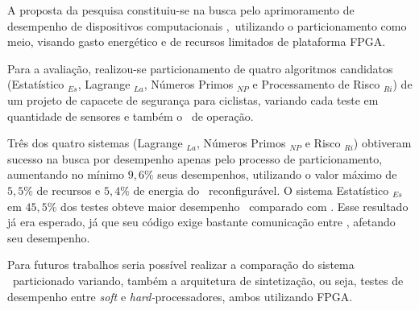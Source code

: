     A proposta da pesquisa constituiu-se na busca pelo aprimoramento de desempenho de dispositivos computacionais \wearables,\ utilizando o particionamento como meio, visando gasto energético e de recursos limitados de plataforma FPGA.
    
    Para a avaliação, realizou-se particionamento de quatro algoritmos candidatos (Estatístico \A$_{Es}$, Lagrange \A$_{La}$, Números Primos  \A$_{NP}$ e Processamento de Risco \A$_{Ri}$) de um projeto de capacete de segurança para ciclistas, variando cada teste em quantidade de sensores e também o \buffer\ de operação.
    
    Três dos quatro sistemas (Lagrange \Ss$_{La}$, Números Primos \Ss$_{NP}$ e Risco \Ss$_{Ri}$) obtiveram sucesso na busca por desempenho apenas pelo processo de particionamento, aumentando no mínimo $9,6\%$ seus desempenhos, utilizando o valor máximo de $ 5,5\% $ de recursos e $ 5,4\% $ de energia do \hardware\ reconfigurável.
    O sistema Estatístico \Ss$_{Es}$ em $45,5\%$ dos testes obteve maior desempenho \software\ comparado com \hardware.
    Esse resultado já era esperado, já que seu código exige bastante comunicação entre \hs, afetando seu desempenho.
    
    Para futuros trabalhos seria possível realizar a comparação do sistema \wearable\ particionado variando, também a arquitetura de sintetização, ou seja, testes de desempenho entre \textit{soft} e \textit{hard-}processadores, ambos utilizando FPGA.
    
    
    
    
        
